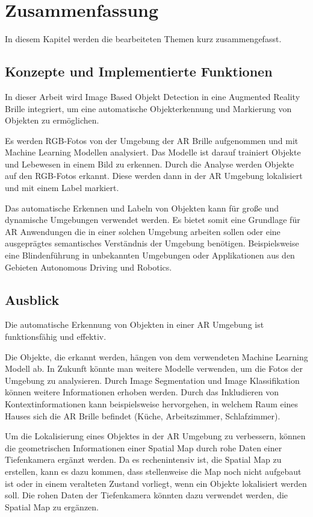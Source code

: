 \section{Zusammenfassung}

In diesem Kapitel werden die bearbeiteten Themen kurz zusammengefasst.

\subsection{Konzepte und Implementierte Funktionen}

In dieser Arbeit wird Image Based Objekt Detection in eine Augmented Reality Brille integriert, um eine automatische Objekterkennung und Markierung von Objekten zu ermöglichen.

Es werden RGB-Fotos von der Umgebung der AR Brille aufgenommen und mit Machine Learning Modellen analysiert.
Das Modelle ist darauf trainiert Objekte und Lebewesen in einem Bild zu erkennen. Durch die Analyse werden Objekte auf den RGB-Fotos erkannt. Diese werden dann in der AR Umgebung lokalisiert und mit einem Label markiert.

Das automatische Erkennen und Labeln von Objekten kann für große und dynamische Umgebungen verwendet werden. Es bietet somit eine Grundlage für AR Anwendungen die in einer solchen Umgebung arbeiten sollen oder eine ausgeprägtes semantisches Verständnis der Umgebung benötigen. Beispielsweise eine Blindenführung in unbekannten Umgebungen oder Applikationen aus den Gebieten Autonomous Driving und Robotics. 

\subsection{Ausblick}

Die automatische Erkennung von Objekten in einer AR Umgebung ist funktionsfähig und effektiv.

Die Objekte, die erkannt werden, hängen von dem verwendeten Machine Learning Modell ab. In Zukunft könnte man weitere Modelle verwenden, um die Fotos der Umgebung zu analysieren. Durch Image Segmentation und Image Klassifikation können weitere Informationen erhoben werden. Durch das Inkludieren von Kontextinformationen kann beispielsweise hervorgehen, in welchem Raum eines Hauses sich die AR Brille befindet (Küche, Arbeitszimmer, Schlafzimmer).

Um die Lokalisierung eines Objektes in der AR Umgebung zu verbessern, können die geometrischen Informationen einer Spatial Map durch rohe Daten einer Tiefenkamera ergänzt werden. Da es rechenintensiv ist, die Spatial Map zu erstellen, kann es dazu kommen, dass stellenweise die Map noch nicht aufgebaut ist oder in einem veralteten Zustand vorliegt, wenn ein Objekte lokalisiert werden soll. Die rohen Daten der Tiefenkamera könnten dazu verwendet werden, die Spatial Map zu ergänzen. 

